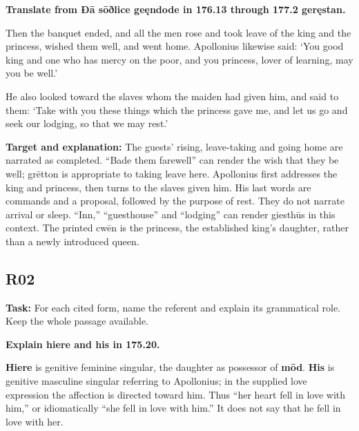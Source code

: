 \textbf{Translate from Ðā sōðlice geęndode in 176.13 through 177.2 geręstan.}

Then the banquet ended, and all the men rose and took leave of the king and the princess, wished them well, and went home. Apollonius likewise said: ‘You good king and one who has mercy on the poor, and you princess, lover of learning, may you be well.’

He also looked toward the slaves whom the maiden had given him, and said to them: ‘Take with you these things which the princess gave me, and let us go and seek our lodging, so that we may rest.’

\textbf{Target and explanation:} The guests’ rising, leave-taking and going home are narrated as completed. “Bade them farewell” can render the wish that they be well; grētton is appropriate to taking leave here. Apollonius first addresses the king and princess, then turns to the slaves given him. His last words are commands and a proposal, followed by the purpose of rest. They do not narrate arrival or sleep. “Inn,” “guesthouse” and “lodging” can render giesthūs in this context. The printed cwēn is the princess, the established king’s daughter, rather than a newly introduced queen.

\subsection*{R02}

\textbf{Task:} For each cited form, name the referent and explain its grammatical role. Keep the whole passage available.

\textbf{Explain hiere and his in 175.20.}

\textbf{Hiere} is genitive feminine singular, the daughter as possessor of \textbf{mōd}. \textbf{His} is genitive masculine singular referring to Apollonius; in the supplied love expression the affection is directed toward him. Thus “her heart fell in love with him,” or idiomatically “she fell in love with him.” It does not say that he fell in love with her.


